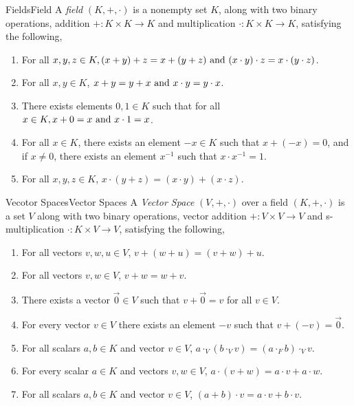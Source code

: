 \documentclass{article}
\begin{document}
\begin{definition}{Fields}{Field}
    A \emph{field} $\left(K, +, \cdot\right)$ is a nonempty set $K$, along with two binary operations,
    addition $+: K \times K \to K$
    and multiplication $\cdot: K \times K \to K$,
    satisfying the following,

    \begin{enumerate}[label=(\roman*)]
        \item  For all $x, y, z \in K, (x + y) + z = x + (y + z) \text{ and } (x \cdot y) \cdot z = x \cdot (y \cdot z)$.
        \item  For all $x, y \in K$, $x + y = y + x \text{ and } x \cdot y = y \cdot x$.
        \item  There exists elements $0, 1 \in K$ such that for all $x \in K, x + 0 = x \text{ and } x \cdot 1 = x$.
        \item  For all $x \in K$, there exists an element $-x \in K$ such that $x + (-x) = 0$, and if $x \neq 0$, there exists an element $x^{-1}$ such that $x \cdot x^{-1} = 1$.
        \item  For all $x, y, z \in K$, $x \cdot (y + z) = (x \cdot y) + (x \cdot z)$.
    \end{enumerate}
\end{definition}

\begin{definition}{Vecotor Spaces}{Vector Spaces}
    A \emph{Vector Space} $\left(V, +, \cdot\right)$ over a field $\left(K, +, \cdot\right)$ is a set $V$ along with two binary operations,
    vector addition $+: V \times V \to V$
    and s-multiplication $\cdot: K \times V \to V$,
    satisfying the following,

    \begin{enumerate}[label=(\roman*)]
        \item  For all vectors $v, w, u \in V$, $v + (w + u) = (v + w) + u$.
        \item  For all vectors $v, w \in V$, $v + w = w + v$.
        \item  There exists a vector $\vec{0} \in V$ such that $v + \vec{0} = v$ for all $v \in V$.
        \item  For every vector $v \in V$ there exists an element $-v$ such that $v + (-v) = \vec{0}$.
        \item  For all scalars $a, b \in K$ and vector $v \in V$, $a \cdot_V (b \cdot_V v) = (a \cdot_F b) \cdot_V v$.
        \item  For every scalar $a \in K$ and vectors $v, w \in V$, $a \cdot (v + w) = a \cdot v + a \cdot w$.
        \item  For all scalars $a, b \in K$ and vector $v\in V$, $(a + b) \cdot v = a \cdot v + b \cdot v$.
    \end{enumerate}
\end{definition}
\end{document}

